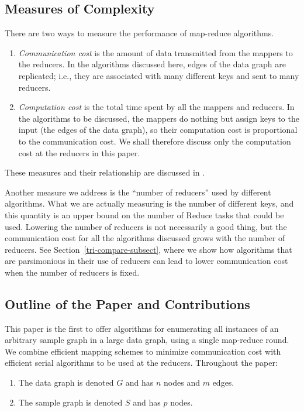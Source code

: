 \subsection{Measures of Complexity}
\label{costs-subsect}

There are two ways to measure the performance of map-reduce algorithms.

\begin{enumerate}
\item {\em Communication cost} is the amount of data transmitted from the mappers to the reducers.  In the algorithms discussed here, edges of the data graph are replicated; i.e., they are associated with many different keys and sent to many reducers.

\item {\em Computation cost} is the total time spent by all the mappers and reducers. In the algorithms to be discussed, the mappers do nothing but assign keys to the input (the edges of the data graph), so their computation cost is proportional to the communication cost. We shall therefore discuss only the computation cost at the reducers in this paper.
\end{enumerate}
These measures and their relationship are discussed in \cite{ABCPU-EDBT11}.

Another measure we address is the ``number of reducers'' used by different algorithms. What we are actually measuring is the number of different keys, and this quantity is an upper bound on the number of Reduce tasks that could be used.  Lowering the number of reducers is not necessarily a good thing, but the communication cost for all the algorithms discussed grows with the number of reducers.  See Section~\ref{tri-compare-subsect}, where we show how algorithms that are parsimonious in their use of reducers can lead to lower communication cost when the number of reducers is fixed.


\subsection{Outline of the Paper and Contributions}
\label{outline-subsect}

This paper is the first to offer algorithms for enumerating all instances of an arbitrary sample graph in a large data graph, using a single map-reduce round.  We combine efficient mapping schemes to minimize communication cost with efficient serial algorithms to be used at the reducers.
Throughout the paper:

\begin{enumerate}
\item The data graph is denoted $G$ and has $n$ nodes and $m$ edges.

\item The sample graph is denoted $S$ and has $p$ nodes.
\end{enumerate}

